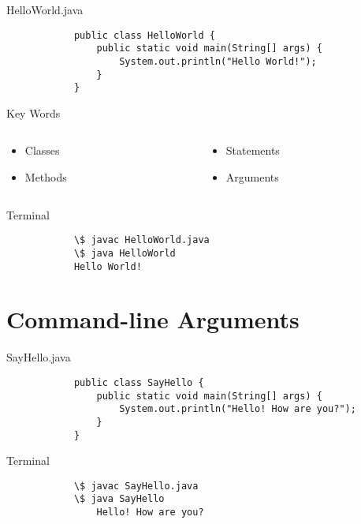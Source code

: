 \documentclass[10pt, compress]{beamer}
\begin{document}
\begin{slide}
	\begin{block}{HelloWorld.java}
		\begin{verbatim}
			public class HelloWorld {
			    public static void main(String[] args) {
			        System.out.println("Hello World!");
			    }
			}
		\end{verbatim}
	\end{block}
	\pause
	\begin{block}{Key Words}
		\begin{columns}
		\begin{column}{0.5\textwidth}
			\begin{itemize}
				\item[] Classes
				\item[] Methods
			\end{itemize}
		\end{column}
		\begin{column}{0.5\textwidth}
			\begin{itemize}
				\item[] Statements
				\item[] Arguments
			\end{itemize}
		\end{column}
		\end{columns}
	\end{block}
\end{slide}

\begin{slide}
	\begin{block}{Terminal}
		\begin{verbatim}
			\$ javac HelloWorld.java
			\$ java HelloWorld
			Hello World!
		\end{verbatim}
	\end{block}
\end{slide}

\section{Command-line Arguments}

\begin{slide}
	\begin{block}{SayHello.java}
		\begin{verbatim}
			public class SayHello {
			    public static void main(String[] args) {
			        System.out.println("Hello! How are you?");
			    }
			}
		\end{verbatim}
	\end{block}
	\begin{block}{Terminal}
		\begin{verbatim}
			\$ javac SayHello.java
			\$ java SayHello
			    Hello! How are you?
		\end{verbatim}
	\end{block}
\end{slide}
\end{document}
